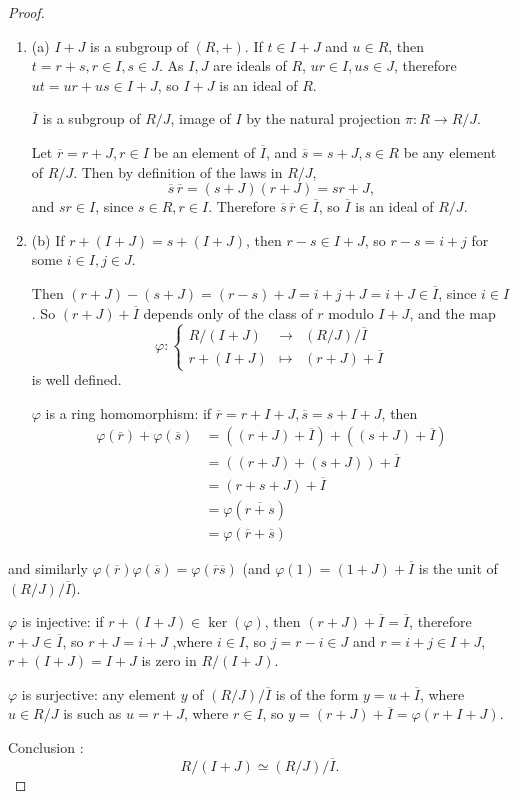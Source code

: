 \documentclass[11pt,a4paper]{article}
\newcommand{\be} {\begin{enumerate}}
\newcommand{\ee} {\end{enumerate}}
\begin{document}
\begin{proof}
\be
\item[(a)] $I+J$ is a subgroup of $(R,+)$. If $t \in I+J$ and $u \in R$, then $t = r+s, r \in I, s \in J$. As $I,J$ are ideals of $R$, $ur \in I, us \in J$, therefore $ut = ur + us \in I+J$, so $I+J$ is an ideal of $R$.

$\overline{I}$ is a subgroup of $R/J$, image of $I$ by the natural projection $\pi : R \to R/J$.

Let $\overline{r}= r+ J , r \in I$ be an element of $\overline{I}$, and $\overline{s} = s + J, s \in R$ be any element of $R/J$. Then by definition of the laws in $R/J$,
$$\overline{s}\, \overline{r} = (s+J)(r+J) = sr + J,$$
and $sr \in I$, since $s \in R, r \in I$.
Therefore $\overline{s}\, \overline{r} \in \overline{I}$, so $\overline{I}$ is an ideal of $R/J$.

\item[(b)] If $r+ (I + J) = s + (I+J)$, then $r-s \in I+J$, so $r-s = i+j$ for some  $ i \in I,j\in J$.

Then $(r+J) - (s+J) = (r-s) + J = i+j + J  = i+J \in \overline{I}$, since $i\in I$. So $(r+J)+ \overline{I}$ depends only of the class of $r$ modulo $I+J$, and the map
$$\varphi :  
\left\{
\begin{array}{ccc}
  R/(I+J)& \to   &  (R/J)/\overline{I} \\
r+(I+J) &\mapsto &(r+J) + \overline{I} 
\end{array}
\right.
$$
is well defined.

$\varphi$ is a ring homomorphism: if $\overline{r} = r+ I+J, \overline{s} = s+ I+J$, then 
\begin{align*}
\varphi(\overline{r}) + \varphi(\overline{s}) &= ((r+J) + \overline{I} ) + ((s+J) + \overline{I} ) \\
&= ((r+J) + (s+J)) + \overline{I}\\
&= (r+s + J) +\overline{I}\\
&= \varphi(\overline{r+s})\\
&= \varphi(\overline{r} +\overline{s})
\end{align*}
\ee
and similarly $\varphi(\overline{r})  \varphi(\overline{s}) =  \varphi(\overline{r} \overline{s})$ (and $\varphi(1) = (1 + J)+ \overline{I}$ is the unit of $(R/J)/\overline{I}$).

$\varphi$ is injective: if $r+(I+J) \in \ker(\varphi)$, then $(r+J)+\overline{I}  = \overline{I}$, therefore $r+J \in \overline I$, so $r+J = i +J$ ,where $i \in I$, so $j = r-i \in J$ and $r = i+j \in I+J$, $r+(I+J) = I+J$ is zero in $R/(I+J)$.

$\varphi$ is surjective: any element $y$ of $(R/J)/\overline{I}$ is of the form $y= u + \overline{I}$, where $u \in R/J$ is such as $u = r+J$, where $r \in I$, so 
$y = (r+ J) + \overline{I} = \varphi(r + I+J)$.

Conclusion : 
$$R/(I+J) \simeq (R/J)/\overline{I}.$$
\end{proof}
\end{document}
